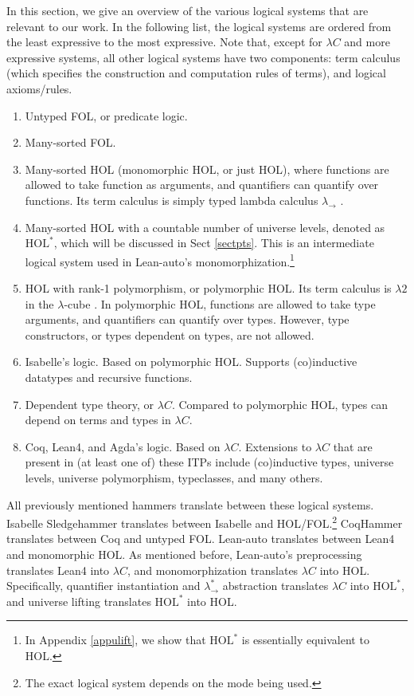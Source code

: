   In this section, we give an overview of the various logical systems
  that are relevant to our work. In the following list, the logical systems
  are ordered from the least expressive to the most expressive. Note that, except
  for $\lambda C$ and more expressive systems, all other logical systems have
  two components: term calculus (which specifies the construction and computation
  rules of terms), and logical axioms/rules.
  \begin{enumerate}
    \item Untyped FOL, or predicate logic.
    \item Many-sorted FOL.
    \item Many-sorted HOL (monomorphic HOL, or just HOL), where functions are allowed
      to take function as arguments, and quantifiers can quantify over functions.
      Its term calculus is simply typed lambda calculus $\lambda_\to$ \cite{LambdaWithType}.
    \item Many-sorted HOL with a countable number of universe levels, denoted as $\text{HOL}^*$,
      which will be discussed in Sect \ref{sectpts}. This is an
      intermediate logical system used in Lean-auto's monomorphization.\footnote{In Appendix \ref{appulift}, we
      show that $\text{HOL}^*$ is essentially equivalent to HOL.}
    \item HOL with rank-1 polymorphism, or polymorphic HOL. Its term calculus is
      $\lambda 2$ in the $\lambda$-cube \cite{LambdaWithType}. In polymorphic HOL, functions are
      allowed to take type arguments, and quantifiers can quantify over types. However, type
      constructors, or types dependent on types, are not allowed.
    \item Isabelle's logic. Based on polymorphic HOL. Supports (co)inductive datatypes and recursive functions.
    \item Dependent type theory, or $\lambda C$. Compared to polymorphic HOL, types can depend on terms and types in $\lambda C$.
    \item Coq, Lean4, and Agda's logic. Based on $\lambda C$. Extensions to $\lambda C$ that are
      present in (at least one of) these ITPs include (co)inductive types, universe levels,
      universe polymorphism, typeclasses, and many others.
  \end{enumerate}
  
  \noindent All previously mentioned hammers translate between these logical systems. Isabelle
  Sledgehammer translates between Isabelle and
  HOL/FOL.\footnote{The exact logical system depends on the mode being used.}
  CoqHammer translates between Coq and untyped FOL. Lean-auto translates
  between Lean4 and monomorphic HOL. As mentioned before, Lean-auto's
  preprocessing translates Lean4 into $\lambda C$, and monomorphization
  translates $\lambda C$ into HOL. Specifically, quantifier instantiation
  and $\lambda_\to^*$ abstraction translates $\lambda C$ into $\text{HOL}^*$,
  and universe lifting translates $\text{HOL}^*$ into HOL.

